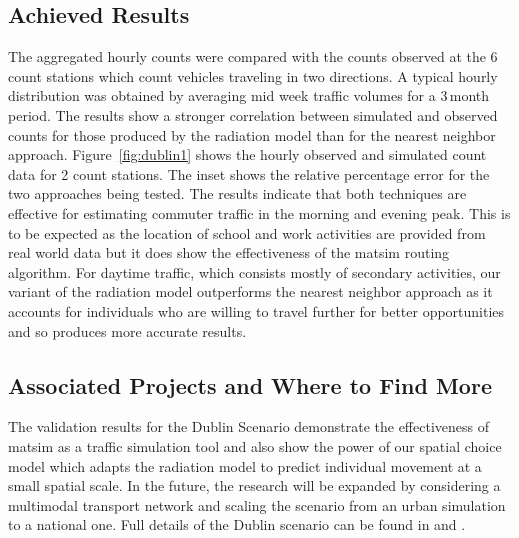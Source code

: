 \subsection{Achieved Results}
The aggregated hourly counts were compared with the counts observed at the 6\,count stations which count vehicles traveling in two directions. A typical hourly distribution was obtained by averaging mid week traffic volumes for a 3\,month period. The results show a stronger correlation between simulated and observed counts for those produced by the radiation model than for the nearest neighbor approach. Figure~\ref{fig:dublin1} shows the hourly observed and simulated count data for 2 count stations. The inset shows the relative percentage error for the two approaches being tested. The results indicate that both techniques are effective for estimating commuter traffic in the morning and evening peak. This is to be expected as the location of school and work activities are provided from real world data but it does show the effectiveness of the \gls{matsim} routing algorithm. For daytime traffic, which consists mostly of secondary activities, our variant of the radiation model outperforms the nearest neighbor approach as it accounts for individuals who are willing to travel further for better opportunities and so produces more accurate results.

\subsection{Associated Projects and Where to Find More}
The validation results for the Dublin Scenario demonstrate the effectiveness of \gls{matsim} as a traffic simulation tool and also show the power of our spatial choice model which adapts the radiation model to predict individual movement at a small spatial scale. In the future, the research will be expanded by considering a \gls{multimodal} transport network and scaling the scenario from an urban simulation to a national one. Full details of the Dublin scenario can be found in \citet[][]{McArdleEtAl_IWUC_2012} and \citet[][]{McArdleEtAl_ACMTIS_2014}.

